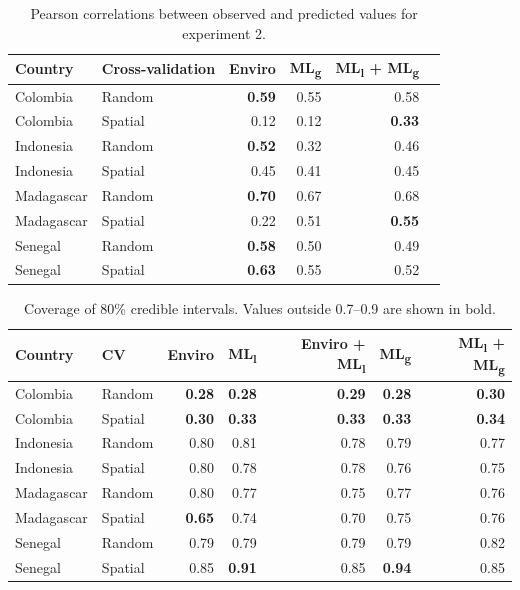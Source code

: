 \documentclass[review]{elsarticle}
\begin{document}





\begin{table}[t!]

\centering
\begin{tabular}{llrrrr}
Country &  Cross-validation & Enviro &   ML\textsubscript{g} & ML\textsubscript{l} + ML\textsubscript{g} \\
\hline 
 Colombia & Random &  \textbf{0.59} &0.55 & 0.58 \\
 Colombia &  Spatial &  0.12 &  0.12 & \textbf{0.33}\\
 Indonesia &  Random &  \textbf{0.52} & 0.32 & 0.46 \\
 Indonesia &  Spatial &  0.45 & 0.41 & 0.45 \\
 Madagascar &  Random &  \textbf{0.70} &  0.67 & 0.68 \\
 Madagascar &  Spatial &  0.22 &  0.51 & \textbf{0.55}\\
 Senegal &  Random &  \textbf{0.58} &  0.50 & 0.49 \\
 Senegal &  Spatial &   \textbf{0.63} & 0.55 & 0.52 \\

\end{tabular}
\caption{Pearson correlations between observed and predicted values for experiment 2. }
\label{t:results2}

\end{table}



\begin{table}[t!]

\centering
\begin{tabular}{llrrrrr}
Country &  CV & Enviro & ML\textsubscript{l} &  Enviro + ML\textsubscript{l} & ML\textsubscript{g} & ML\textsubscript{l} + ML\textsubscript{g} \\
\hline 
 Colombia & Random & \textbf{0.28} & \textbf{0.28} & \textbf{0.29} & \textbf{0.28} & \textbf{0.30} \\
 Colombia &  Spatial & \textbf{0.30} & \textbf{0.33}  & \textbf{0.33} & \textbf{0.33} & \textbf{0.34}  \\
 Indonesia & Random &0.80 & 0.81& 0.78& 0.79& 0.77  \\
 Indonesia & Spatial & 0.80 & 0.78& 0.78& 0.76& 0.75  \\
 Madagascar &  Random & 0.80 & 0.77& 0.75& 0.77& 0.76 \\
 Madagascar & Spatial & \textbf{0.65} & 0.74& 0.70& 0.75 & 0.76   \\
 Senegal & Random &0.79 & 0.79& 0.79& 0.79& 0.82 \\
 Senegal & Spatial & 0.85 & \textbf{0.91}& 0.85& \textbf{0.94} & 0.85  \\
\end{tabular}
\caption{Coverage of 80\% credible intervals. Values outside 0.7--0.9 are shown in bold.}
\label{t:coverage}
\end{table}
\end{document}
